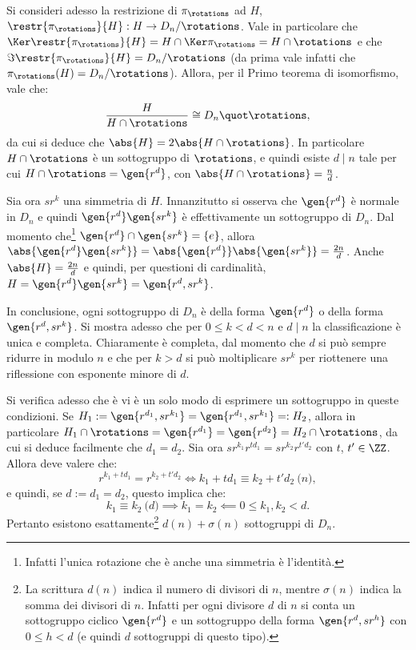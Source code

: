 \documentclass[12pt]{scrartcl}
\begin{document}
	
	Si consideri adesso
	la restrizione di $\pi_\rotations$ ad $H$, $\restr{\pi_\rotations}{H} : H \to D_n / \rotations$. Vale in particolare che $\Ker \restr{\pi_\rotations}{H} = H \cap \Ker \pi_\rotations = H \cap \rotations$ e che $\Im \restr{\pi_\rotations}{H} = D_n / \rotations$
	(da prima vale infatti che $\pi_\rotations(H) = D_n / \rotations$). Allora, per il Primo
	teorema di isomorfismo, vale che:
	\[ \frac{H}{H \cap \rotations} \cong D_n \quot \rotations, \]
	da cui si deduce che $\abs{H} = 2 \abs{H \cap \rotations}$. In particolare $H \cap \rotations$ è un sottogruppo di $\rotations$, e quindi esiste $d \mid n$ tale per cui
	$H \cap \rotations = \gen{r^d}$, con $\abs{H \cap \rotations} = \frac{n}{d}$. \medskip
	
	
	Sia ora $s r^k$ una simmetria di $H$.
	Innanzitutto si osserva che $\gen{r^d}$ è normale in $D_n$ e quindi
	$\gen{ r^d }\gen{ s r^k }$ è effettivamente un sottogruppo di $D_n$. Dal momento che\footnote{
		Infatti l'unica rotazione che è anche una simmetria è l'identità.
	}
	$\gen{ r^d } \cap \gen{ s r^k } = \{ e \}$, allora $\abs{\gen{ r^d } \gen{ s r^k }} = \abs{\gen{r^d}} \abs{\gen{s r^k}} = \frac{2n}{d}$. Anche $\abs{H} = \frac{2n}{d}$ e
	quindi, per questioni di cardinalità, $H = \gen{ r^d } \gen{ s r^k } = \gen{ r^d, s r^k }$.
	\medskip
	
	
	In conclusione, ogni sottogruppo di $D_n$ è della forma $\gen{r^d}$ o della forma
	$\gen{r^d, sr^k}$. Si mostra adesso che per $0 \leq k < d < n$ e $d \mid n$ la
	classificazione è unica e completa. Chiaramente è completa, dal momento che
	$d$ si può sempre ridurre in modulo $n$ e che per $k>d$ si può moltiplicare
	$sr^k$ per riottenere una riflessione con esponente minore di $d$. \medskip
	
	
	Si verifica adesso che è vi è un solo modo di esprimere un sottogruppo in queste
	condizioni. Se $H_1 := \gen{r^{d_1}, s r^{k_1}} = \gen{r^{d_1}, s r^{k_1}} =: H_2$, allora
	in particolare $H_1 \cap \rotations = \gen{r^{d_1}} = \gen{r^{d_2}} = H_2 \cap \rotations$,
	da cui si deduce facilmente che $d_1 = d_2$. Sia ora $s r^{k_1} r^{t d_1} =
	s r^{k_2} r^{t' d_2}$ con $t$, $t' \in \ZZ$. Allora deve valere che:
	\[ r^{k_1 + t d_1} =r^{k_2 + t' d_2} \iff k_1 + t d_1 \equiv k_2 + t' d_2 \pod n, \]
	e quindi, se $d := d_1 = d_2$, questo implica che:
	\[ k_1 \equiv k_2 \pod d \implies k_1 = k_2 \impliedby 0 \leq k_1, k_2 < d. \]
	Pertanto esistono esattamente\footnote{
		La scrittura $d(n)$ indica il numero di divisori di $n$, mentre $\sigma(n)$ indica la 
		somma dei divisori di $n$. Infatti per ogni divisore $d$ di $n$ si conta un
		sottogruppo ciclico $\gen{r^d}$ e un sottogruppo della forma $\gen{r^d, sr^h}$
		con $0 \leq h < d$ (e quindi $d$ sottogruppi di questo tipo).
	} $d(n) + \sigma(n)$ sottogruppi di $D_n$. \bigskip
	
\end{document}
